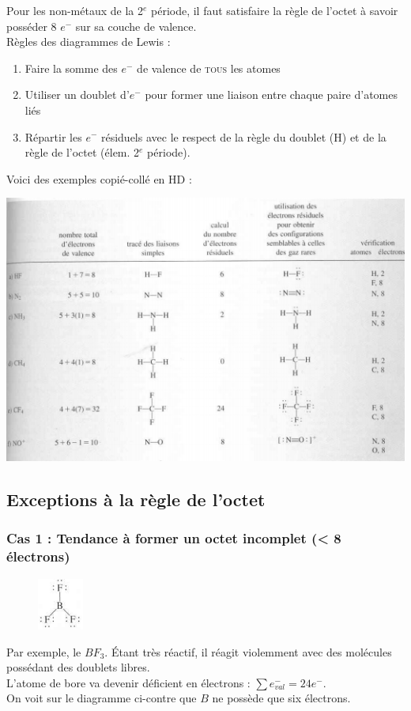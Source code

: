 \documentclass[12pt, a4paper]{article}
\begin{document}
Pour les non-métaux de la 2$^e$ période, il faut satisfaire la règle de l'octet à savoir posséder 8 $e^-$ sur sa couche de valence.\\
Règles des diagrammes de Lewis :
\begin{enumerate}
\item Faire la somme des $e^-$ de valence de \textsc{tous} les atomes
\item Utiliser un doublet d'$e^-$ pour former une liaison entre chaque paire d'atomes liés
\item Répartir les $e^-$ résiduels avec le respect de la règle du doublet (H) et de la règle de l'octet (élem. 2$^e$ période).
\end{enumerate}
Voici des exemples copié-collé en HD : 
\begin{center}
\includegraphics[scale=0.85]{image7.png}\\
\end{center}

\subsection{Exceptions à la règle de l'octet}
\subsubsection{Cas 1 :  Tendance à former un octet incomplet (< 8 électrons)}
\begin{figure}
\includegraphics[width=1.5cm]{image8.png}
\end{figure}
Par exemple, le $BF_3$. Étant très réactif, il réagit violemment avec des molécules possédant des doublets libres.\\
L'atome de bore va devenir déficient en électrons : $\sum e^-_{val} = 24 e^-$.\\
On voit sur le diagramme ci-contre que $B$ ne possède que six électrons.
\end{document}
